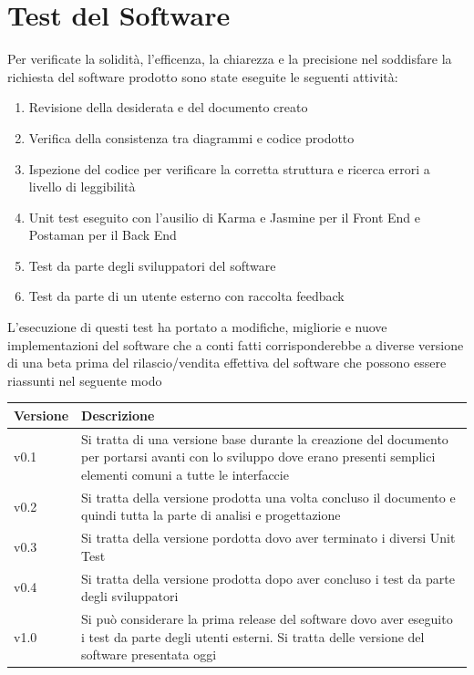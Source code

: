 \documentclass[a4paper, 11pt,oneside]{book}
\begin{document}
\chapter{Test del Software}
    Per verificate la solidità, l'efficenza, la chiarezza e la precisione nel soddisfare la richiesta del software prodotto sono state eseguite le seguenti attività:
    \begin{enumerate}
        \item Revisione della desiderata e del documento creato
        \item Verifica della consistenza tra diagrammi e codice prodotto
        \item Ispezione del codice per verificare la corretta struttura e ricerca errori a livello di leggibilità
        \item Unit test eseguito con l'ausilio di Karma e Jasmine per il Front End e Postaman per il Back End
        \item Test da parte degli sviluppatori del software
        \item Test da parte di un utente esterno con raccolta feedback
    \end{enumerate}
    L'esecuzione di questi test ha portato a modifiche, migliorie e nuove implementazioni del software che a conti fatti corrisponderebbe a diverse versione di una beta prima del rilascio/vendita effettiva del software che possono essere riassunti nel seguente modo
    \begin{center}
        \begin{tabular}{|| m{} | m{} ||}
            \hline
            Versione & Descrizione \\
            \hline
            \hline
            v0.1 & Si tratta di una versione base durante la creazione del documento per portarsi avanti con lo sviluppo dove erano presenti semplici elementi comuni a tutte le interfaccie\\
            \hline
            v0.2 & Si tratta della versione prodotta una volta concluso il documento e quindi tutta la parte di analisi e progettazione \\
            \hline
            v0.3 & Si tratta della versione pordotta dovo aver terminato i diversi Unit Test \\
            \hline
            v0.4 & Si tratta della versione prodotta dopo aver concluso i test da parte degli sviluppatori \\
            \hline
            v1.0 & Si può considerare la prima release del software dovo aver eseguito i test da parte degli utenti esterni. Si tratta delle versione del software presentata oggi \\
            \hline
        \end{tabular}
    \end{center}
\end{document}
